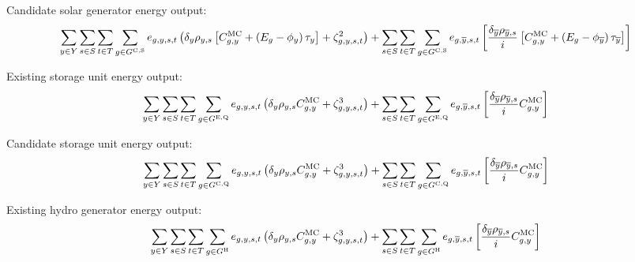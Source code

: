 \documentclass{article}
\newcommand{\sGeneratorsCandidateSolar}{G^{\mathrm{C,S}}}
\newcommand{\sGeneratorsHydro}{G^{\mathrm{H}}}
\newcommand{\sStorageExisting}{G^{\mathrm{E,Q}}}
\newcommand{\sStorageCandidate}{G^{\mathrm{C,Q}}}
\newcommand{\sScenarios}{S}
\newcommand{\sIntervals}{T}
\newcommand{\iGenerator}{g}
\newcommand{\iYear}{y}
\newcommand{\iYearTerminal}{\overline{\iYear}}
\newcommand{\iScenario}{s}
\newcommand{\iInterval}{t}
\newcommand{\cScenarioDuration}[1][\iYear,\iScenario]{\rho_{#1}}
\newcommand{\cMarginalCost}[1][\iGenerator,\iYear]{C^{\mathrm{MC}}_{#1}}
\newcommand{\cEmissionsIntensity}[1][\iGenerator]{E_{#1}}
\newcommand{\cInterestRate}{i}
\newcommand{\cDiscountRate}[1][\iYear]{\delta_{#1}}
\newcommand{\vBaseline}[1][\iYear]{\phi_{#1}}
\newcommand{\vPermitPrice}[1][\iYear]{\tau_{#1}}
\newcommand{\vEnergy}[1][\iGenerator,\iYear,\iScenario,\iInterval]{e_{#1}}
\newcommand{\dGeneratorEnergyOutput}[1][\iGenerator,\iYear,\iScenario,\iInterval]{\zeta_{#1}^{2}}
\newcommand{\dStorageEnergyOutput}[1][\iGenerator,\iYear,\iScenario,\iInterval]{\zeta_{#1}^{3}}
\begin{document}
Candidate solar generator energy output:
\begin{equation}
	\sumIntervals \sum\limits_{\iGenerator \in \sGeneratorsCandidateSolar} \vEnergy \left(\cDiscountRate\cScenarioDuration \left[\cMarginalCost + \left(\cEmissionsIntensity - \vBaseline\right)\vPermitPrice \right] + \dGeneratorEnergyOutput \right) + \sum\limits_{\iScenario \in \sScenarios} \sum\limits_{\iInterval \in \sIntervals} \sum\limits_{\iGenerator \in \sGeneratorsCandidateSolar} \vEnergy[\iGenerator,\iYearTerminal,\iScenario,\iInterval] \left[ \frac{\cDiscountRate[\iYearTerminal] \cScenarioDuration[\iYearTerminal,\iScenario]}{\cInterestRate} \left[\cMarginalCost + \left(\cEmissionsIntensity - \vBaseline[\iYearTerminal] \right)\vPermitPrice[\iYearTerminal] \right] \right]
\end{equation}

Existing storage unit energy output:
\begin{equation}
	\sumIntervals \sum\limits_{\iGenerator \in \sStorageExisting} \vEnergy \left(\cDiscountRate\cScenarioDuration \cMarginalCost + \dStorageEnergyOutput \right) + \sum\limits_{\iScenario \in \sScenarios} \sum\limits_{\iInterval \in \sIntervals} \sum\limits_{\iGenerator \in \sStorageExisting} \vEnergy[\iGenerator,\iYearTerminal,\iScenario,\iInterval] \left[ \frac{\cDiscountRate[\iYearTerminal] \cScenarioDuration[\iYearTerminal,\iScenario]}{\cInterestRate} \cMarginalCost \right]
\end{equation}

Candidate storage unit energy output:
\begin{equation}
	\sumIntervals \sum\limits_{\iGenerator \in \sStorageCandidate} \vEnergy \left(\cDiscountRate\cScenarioDuration \cMarginalCost + \dStorageEnergyOutput \right) + \sum\limits_{\iScenario \in \sScenarios} \sum\limits_{\iInterval \in \sIntervals} \sum\limits_{\iGenerator \in \sStorageCandidate} \vEnergy[\iGenerator,\iYearTerminal,\iScenario,\iInterval] \left[ \frac{\cDiscountRate[\iYearTerminal] \cScenarioDuration[\iYearTerminal,\iScenario]}{\cInterestRate} \cMarginalCost \right]
\end{equation}

Existing hydro generator energy output:
\begin{equation}
	\sumIntervals \sum\limits_{\iGenerator \in \sGeneratorsHydro} \vEnergy \left(\cDiscountRate\cScenarioDuration \cMarginalCost + \dStorageEnergyOutput \right) + \sum\limits_{\iScenario \in \sScenarios} \sum\limits_{\iInterval \in \sIntervals} \sum\limits_{\iGenerator \in \sGeneratorsHydro} \vEnergy[\iGenerator,\iYearTerminal,\iScenario,\iInterval] \left[ \frac{\cDiscountRate[\iYearTerminal] \cScenarioDuration[\iYearTerminal,\iScenario]}{\cInterestRate} \cMarginalCost \right]
\end{equation}
\end{document}
